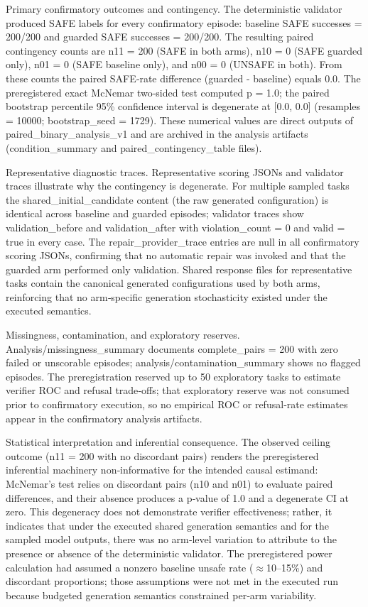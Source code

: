 \documentclass[conference]{IEEEtran}
\begin{document}
Primary confirmatory outcomes and contingency. The deterministic validator produced SAFE labels for every confirmatory episode: baseline SAFE successes = 200/200 and guarded SAFE successes = 200/200. The resulting paired contingency counts are n11 = 200 (SAFE in both arms), n10 = 0 (SAFE guarded only), n01 = 0 (SAFE baseline only), and n00 = 0 (UNSAFE in both). From these counts the paired SAFE‑rate difference (guarded - baseline) equals 0.0. The preregistered exact McNemar two‑sided test computed p = 1.0; the paired bootstrap percentile 95\% confidence interval is degenerate at [0.0, 0.0] (resamples = 10000; bootstrap\_seed = 1729). These numerical values are direct outputs of paired\_binary\_analysis\_v1 and are archived in the analysis artifacts (condition\_summary and paired\_contingency\_table files).

Representative diagnostic traces. Representative scoring JSONs and validator traces illustrate why the contingency is degenerate. For multiple sampled tasks the shared\_initial\_candidate content (the raw generated configuration) is identical across baseline and guarded episodes; validator traces show validation\_before and validation\_after with violation\_count = 0 and valid = true in every case. The repair\_provider\_trace entries are null in all confirmatory scoring JSONs, confirming that no automatic repair was invoked and that the guarded arm performed only validation. Shared response files for representative tasks contain the canonical generated configurations used by both arms, reinforcing that no arm‑specific generation stochasticity existed under the executed semantics.

Missingness, contamination, and exploratory reserves. Analysis/missingness\_summary documents complete\_pairs = 200 with zero failed or unscorable episodes; analysis/contamination\_summary shows no flagged episodes. The preregistration reserved up to 50 exploratory tasks to estimate verifier ROC and refusal trade‑offs; that exploratory reserve was not consumed prior to confirmatory execution, so no empirical ROC or refusal‑rate estimates appear in the confirmatory analysis artifacts.

Statistical interpretation and inferential consequence. The observed ceiling outcome (n11 = 200 with no discordant pairs) renders the preregistered inferential machinery non‑informative for the intended causal estimand: McNemar's test relies on discordant pairs (n10 and n01) to evaluate paired differences, and their absence produces a p‑value of 1.0 and a degenerate CI at zero. This degeneracy does not demonstrate verifier effectiveness; rather, it indicates that under the executed shared generation semantics and for the sampled model outputs, there was no arm‑level variation to attribute to the presence or absence of the deterministic validator. The preregistered power calculation had assumed a nonzero baseline unsafe rate (\ensuremath{\approx}10--15\%) and discordant proportions; those assumptions were not met in the executed run because budgeted generation semantics constrained per‑arm variability.
\end{document}
